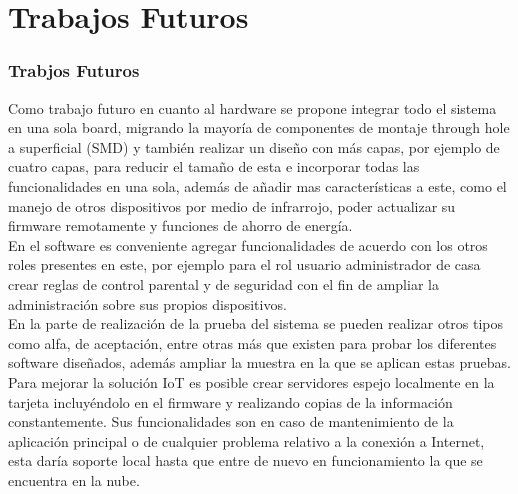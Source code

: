 \section{Trabajos Futuros}
\frametitle{Trabjos Futuros}

Como trabajo futuro en cuanto al hardware se propone integrar todo el sistema en una sola board, migrando la mayoría de componentes de montaje through hole a superficial (SMD) y también realizar un diseño con más capas, por ejemplo de cuatro capas, para reducir el tamaño de esta e incorporar todas las funcionalidades en una sola, además de añadir mas características a este, como el manejo de otros dispositivos por medio de infrarrojo, poder actualizar su firmware remotamente y funciones de ahorro de energía.\\

En el software es conveniente agregar funcionalidades de acuerdo con los otros roles presentes en este, por ejemplo para el rol usuario administrador de casa crear reglas de control parental y de seguridad con el fin de ampliar la administración sobre sus propios dispositivos.\\

En la parte de realización de la prueba del sistema se pueden realizar otros tipos como alfa, de aceptación, entre otras más que existen para probar los diferentes software diseñados, además ampliar la muestra en la que se aplican estas pruebas.\\

Para mejorar la solución IoT es posible crear servidores espejo localmente en la tarjeta incluyéndolo en el firmware y realizando copias de la información constantemente. Sus funcionalidades son en caso de mantenimiento de la aplicación principal o de cualquier problema relativo a la conexión a Internet, esta daría soporte local hasta que entre de nuevo en funcionamiento la que se encuentra en la nube.\\
